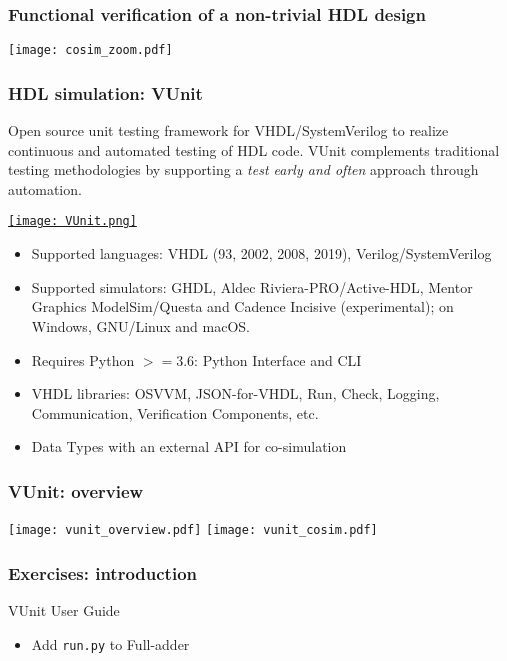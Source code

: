 \documentclass[xcolor={usenames,dvipsnames,svgnames}]{beamer}
\begin{document}
\begin{frame}
\frametitle{Functional verification of a non-trivial HDL design}
\centering
\texttt{[image: cosim\_zoom.pdf]}
\end{frame}

\begin{frame}
\frametitle{HDL simulation: VUnit}
\small
Open source unit testing framework for VHDL/SystemVerilog to realize continuous and automated testing of HDL code. VUnit complements traditional testing methodologies by supporting a \emph{test early and often} approach through automation.

\vfill
\href{https://vunit.github.io/}{\texttt{[image: VUnit.png]}}
\vfill

\tiny
\begin{itemize}
  \item Supported languages: VHDL (93, 2002, 2008, 2019), Verilog/SystemVerilog
  \item Supported simulators: GHDL, Aldec Riviera-PRO/Active-HDL, Mentor Graphics ModelSim/Questa and Cadence Incisive (experimental); on Windows, GNU/Linux and macOS.
  \item Requires Python $>=3.6$: Python Interface and CLI
  \item VHDL libraries: OSVVM, JSON-for-VHDL, Run, Check, Logging, Communication, Verification Components, etc.
  \item Data Types with an external API for co-simulation
\end{itemize}
\end{frame}

\begin{frame}
\frametitle{VUnit: overview}
\centering
\texttt{[image: vunit\_overview.pdf]}
\vfill
\texttt{[image: vunit\_cosim.pdf]}
\end{frame}

\begin{frame}
\frametitle{Exercises: introduction}
\vfill
\begin{center}
VUnit User Guide \href{http://vunit.github.io/user_guide.html}{\faBook}
\end{center}
\vfill
\begin{itemize}
  \item Add \lstinline{run.py} to Full-adder
\end{itemize}
\vfill
\end{frame}
\end{document}
